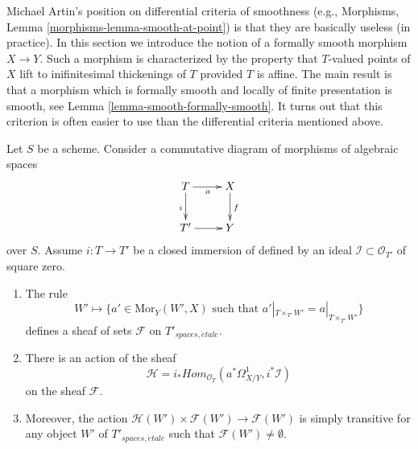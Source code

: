 \noindent
Michael Artin's position on differential criteria of smoothness (e.g.,
Morphisms, Lemma \ref{morphisms-lemma-smooth-at-point}) is that they are
basically useless (in practice). In this section we introduce the
notion of a formally smooth morphism $X \to Y$. Such a morphism is
characterized by the property that $T$-valued points of $X$ lift
to inifinitesimal thickenings of $T$ provided $T$ is affine.
The main result is that a morphism which is formally smooth and
locally of finite presentation is smooth, see
Lemma \ref{lemma-smooth-formally-smooth}.
It turns out that this criterion is often easier to use than the
differential criteria mentioned above.

\begin{lemma}
\label{lemma-action-by-derivations}
Let $S$ be a scheme. Consider a commutative diagram of morphisms of
algebraic spaces
$$
\xymatrix{
T \ar[r]_a \ar[d]_i & X \ar[d]^f \\
T' \ar[r] & Y
}
$$
over $S$. Assume $i : T \to T'$ be a closed immersion of defined by an
ideal $\mathcal{I} \subset \mathcal{O}_{T'}$ of square zero.
\begin{enumerate}
\item The rule
$$
W' \mapsto
\{a' \in \text{Mor}_Y(W', X) \text{ such that }
a'|_{T \times_{T'} W'} = a|_{T \times_{T'} W'}\}
$$
defines a sheaf of sets $\mathcal{F}$ on $T'_{spaces, \acute{e}tale}$.
\item There is an action of the sheaf
$$
\mathcal{H}
=
i_*\textit{Hom}_{\mathcal{O}_T}(a^*\Omega^1_{X/Y}, i^*\mathcal{I})
$$
on the sheaf $\mathcal{F}$.
\item Moreover, the action
$\mathcal{H}(W') \times \mathcal{F}(W') \to \mathcal{F}(W')$
is simply transitive for any object $W'$ of $T'_{spaces, \acute{e}tale}$
such that $\mathcal{F}(W') \not = \emptyset$.
\end{enumerate}
\end{lemma}

